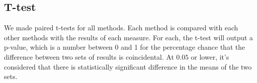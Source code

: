 \subsection{T-test}
We made paired t-tests for all methods. Each method is compared with each other methods with the results of each measure. For each, the t-test will output a p-value, which is a number between 0 and 1 for the percentage chance that the difference between two sets of results is coincidental. At $0.05$ or lower, it's considered that there is statistically significant difference in the means of the two sets.